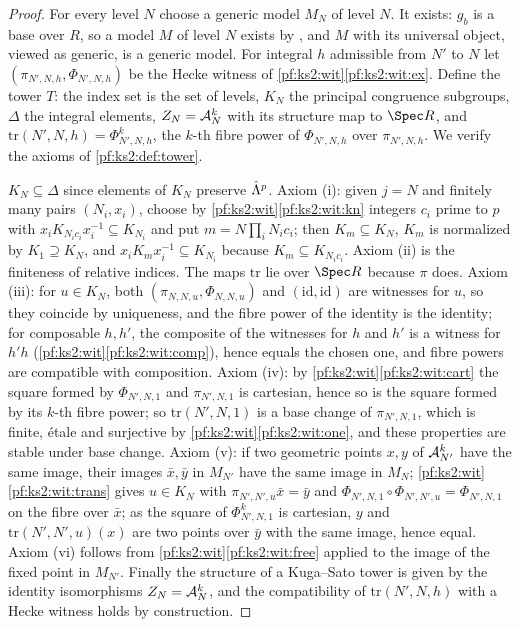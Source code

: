 \begin{proof}
For every level $N$ choose a generic model $M_N$ of level $N$. It exists: $g_b$ is a base over $R$, so a model $M$ of
level $N$ exists by , and $M$ with its universal
object, viewed as generic, is a generic model.
For integral
$h$ admissible from $N'$ to $N$ let $(\pi_{N',N,h},\Phi_{N',N,h})$ be the Hecke witness of
\cref{pf:ks2:wit}\ref{pf:ks2:wit:ex}. Define the tower $T$: the
index set is the set of levels, $K_N$ the principal congruence subgroups, $\Delta$ the integral
elements, $Z_N=\mathcal{A}_N^k$ with its structure map to $\Spec R$, and
$\mathrm{tr}(N',N,h)=\Phi_{N',N,h}^{k}$, the $k$-th fibre power of $\Phi_{N',N,h}$ over
$\pi_{N',N,h}$. We verify the axioms of \cref{pf:ks2:def:tower}.

$K_N\subseteq\Delta$ since elements of $K_N$ preserve $\hat\Lambda^{p}$. Axiom (i): given $j=N$ and
finitely many pairs $(N_i,x_i)$, choose by \cref{pf:ks2:wit}\ref{pf:ks2:wit:kn} integers $c_i$
prime to $p$ with $x_iK_{N_ic_i}x_i^{-1}\subseteq K_{N_i}$ and put $m=N\prod_iN_ic_i$; then
$K_m\subseteq K_N$, $K_m$ is normalized by $K_1\supseteq K_N$, and $x_iK_mx_i^{-1}\subseteq
K_{N_i}$ because $K_m\subseteq K_{N_ic_i}$.
Axiom (ii) is the finiteness of relative indices. The maps $\mathrm{tr}$ lie over $\Spec R$
because $\pi$ does. Axiom (iii): for $u\in K_N$, both $(\pi_{N,N,u},\Phi_{N,N,u})$ and
$(\mathrm{id},\mathrm{id})$ are witnesses for $u$, so they coincide by uniqueness, and the fibre
power of the identity is the identity; for composable $h,h'$, the composite of the witnesses for
$h$ and $h'$ is a witness for $h'h$ (\cref{pf:ks2:wit}\ref{pf:ks2:wit:comp}), hence equals the
chosen one, and fibre powers are compatible with composition. Axiom (iv): by
\cref{pf:ks2:wit}\ref{pf:ks2:wit:cart} the square formed by $\Phi_{N',N,1}$ and $\pi_{N',N,1}$ is
cartesian, hence so is the square formed by its $k$-th fibre power; so $\mathrm{tr}(N',N,1)$ is a base change of
$\pi_{N',N,1}$, which is finite, \'etale and surjective by \cref{pf:ks2:wit}\ref{pf:ks2:wit:one},
and these properties are stable under base change. Axiom (v): if two geometric points $x,y$ of
$\mathcal{A}_{N'}^k$ have the same image, their images $\bar x,\bar y$ in $M_{N'}$ have the same image
in $M_N$; \cref{pf:ks2:wit}\ref{pf:ks2:wit:trans} gives $u\in K_N$ with $\pi_{N',N',u}\bar x=\bar y$
and $\Phi_{N',N,1}\circ\Phi_{N',N',u}=\Phi_{N',N,1}$ on the fibre over $\bar x$; as the square of
$\Phi^k_{N',N,1}$ is cartesian, $y$ and $\mathrm{tr}(N',N',u)(x)$ are two points over $\bar y$
with the same image, hence equal. Axiom (vi) follows from
\cref{pf:ks2:wit}\ref{pf:ks2:wit:free} applied to the image of the fixed point in $M_{N'}$.
Finally the structure of a Kuga--Sato tower is given by the identity isomorphisms
$Z_N=\mathcal{A}_N^k$, and the compatibility of $\mathrm{tr}(N',N,h)$ with a Hecke witness holds by
construction.
\end{proof}

